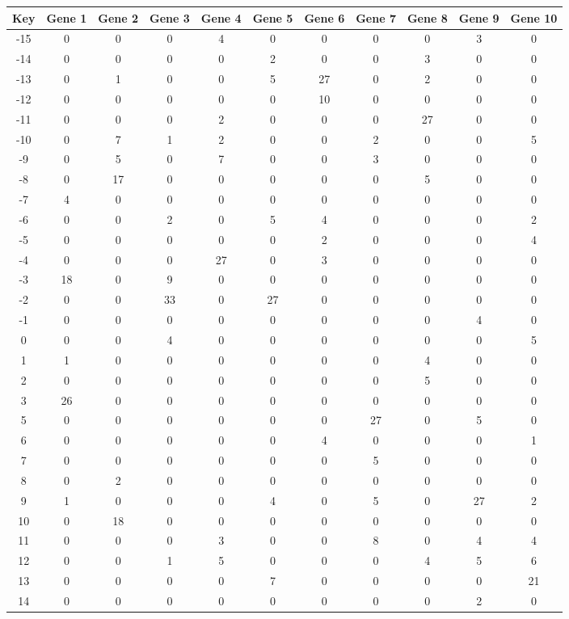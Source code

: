 \begin{tabular}{|c|c|c|c|c|c|c|c|c|c|c|}
\hline
Key & Gene 1 & Gene 2 & Gene 3 & Gene 4 & Gene 5 & Gene 6 & Gene 7 & Gene 8 & Gene 9 & Gene 10 \\
\hline
-15 & 0 & 0 & 0 & 4 & 0 & 0 & 0 & 0 & 3 & 0 \\
-14 & 0 & 0 & 0 & 0 & 2 & 0 & 0 & 3 & 0 & 0 \\
-13 & 0 & 1 & 0 & 0 & 5 & 27 & 0 & 2 & 0 & 0 \\
-12 & 0 & 0 & 0 & 0 & 0 & 10 & 0 & 0 & 0 & 0 \\
-11 & 0 & 0 & 0 & 2 & 0 & 0 & 0 & 27 & 0 & 0 \\
-10 & 0 & 7 & 1 & 2 & 0 & 0 & 2 & 0 & 0 & 5 \\
-9 & 0 & 5 & 0 & 7 & 0 & 0 & 3 & 0 & 0 & 0 \\
-8 & 0 & 17 & 0 & 0 & 0 & 0 & 0 & 5 & 0 & 0 \\
-7 & 4 & 0 & 0 & 0 & 0 & 0 & 0 & 0 & 0 & 0 \\
-6 & 0 & 0 & 2 & 0 & 5 & 4 & 0 & 0 & 0 & 2 \\
-5 & 0 & 0 & 0 & 0 & 0 & 2 & 0 & 0 & 0 & 4 \\
-4 & 0 & 0 & 0 & 27 & 0 & 3 & 0 & 0 & 0 & 0 \\
-3 & 18 & 0 & 9 & 0 & 0 & 0 & 0 & 0 & 0 & 0 \\
-2 & 0 & 0 & 33 & 0 & 27 & 0 & 0 & 0 & 0 & 0 \\
-1 & 0 & 0 & 0 & 0 & 0 & 0 & 0 & 0 & 4 & 0 \\
0 & 0 & 0 & 4 & 0 & 0 & 0 & 0 & 0 & 0 & 5 \\
1 & 1 & 0 & 0 & 0 & 0 & 0 & 0 & 4 & 0 & 0 \\
2 & 0 & 0 & 0 & 0 & 0 & 0 & 0 & 5 & 0 & 0 \\
3 & 26 & 0 & 0 & 0 & 0 & 0 & 0 & 0 & 0 & 0 \\
5 & 0 & 0 & 0 & 0 & 0 & 0 & 27 & 0 & 5 & 0 \\
6 & 0 & 0 & 0 & 0 & 0 & 4 & 0 & 0 & 0 & 1 \\
7 & 0 & 0 & 0 & 0 & 0 & 0 & 5 & 0 & 0 & 0 \\
8 & 0 & 2 & 0 & 0 & 0 & 0 & 0 & 0 & 0 & 0 \\
9 & 1 & 0 & 0 & 0 & 4 & 0 & 5 & 0 & 27 & 2 \\
10 & 0 & 18 & 0 & 0 & 0 & 0 & 0 & 0 & 0 & 0 \\
11 & 0 & 0 & 0 & 3 & 0 & 0 & 8 & 0 & 4 & 4 \\
12 & 0 & 0 & 1 & 5 & 0 & 0 & 0 & 4 & 5 & 6 \\
13 & 0 & 0 & 0 & 0 & 7 & 0 & 0 & 0 & 0 & 21 \\
14 & 0 & 0 & 0 & 0 & 0 & 0 & 0 & 0 & 2 & 0 \\
\hline
\end{tabular}